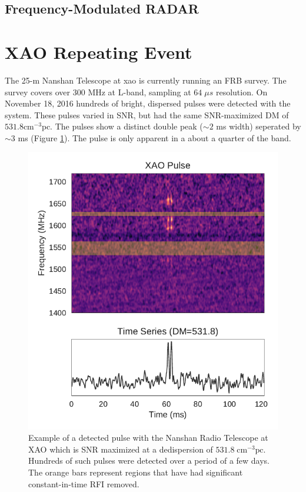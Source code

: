 \documentclass[a4paper,fleqn,usenatbib]{mnras}
\begin{document}
\subsection{Frequency-Modulated RADAR}


\section{XAO Repeating Event}

The 25-m Nanshan Telescope at \gls{xao} is currently running an FRB survey. The
survey covers over 300 MHz at L-band, sampling at $64 \; \mu s$ resolution. On
November 18, 2016 hundreds of bright, dispersed pulses were detected with the
system. These pulses varied in SNR, but had the same SNR-maximized DM of $531.8
\textrm{cm}^{-3} \textrm{pc}$. The pulses show a distinct double peak ($\sim 2$
ms width) seperated by $\sim 3$ ms (Figure \ref{fig:xao_dynamic}). The pulse is
only apparent in a about a quarter of the band.

\begin{figure}
    \includegraphics[width=1.0\linewidth]{figures/XAO_pulse_dynamic.pdf}
    \caption{Example of a detected pulse with the Nanshan Radio Telescope at XAO
    which is SNR maximized at a dedispersion of $531.8 \; \textrm{cm}^{-3}
    \textrm{pc}$. Hundreds of such pulses were detected over a period of a few
    days. The orange bars represent regions that have had significant
    constant-in-time RFI removed.
    }
    \label{fig:xao_dynamic}
\end{figure}
\end{document}
